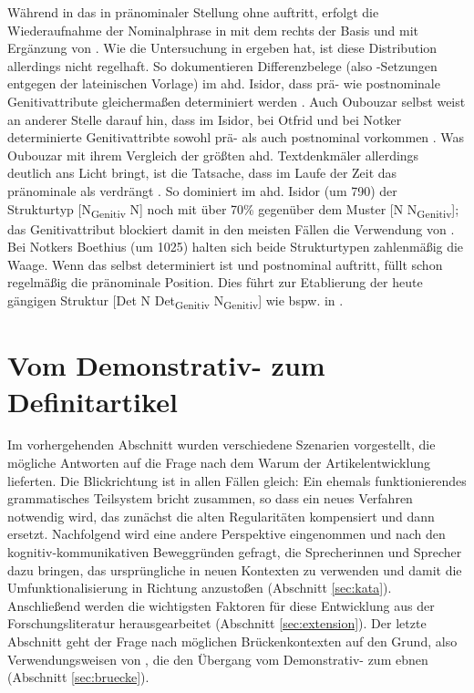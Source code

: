 \noindent
Während in  das   in pränominaler Stellung ohne  auftritt, erfolgt die Wiederaufnahme der Nominalphrase  in  mit dem  rechts der Basis und mit Ergänzung von . Wie die Untersuchung in \textcite{Szczepaniak2015} ergeben hat, ist diese Distribution allerdings nicht regelhaft. So dokumentieren Differenzbelege  (also -Setzungen entgegen der lateinischen Vorlage) im ahd. Isidor, dass prä- wie postnominale Genitivattribute  gleichermaßen determiniert werden \parencite[199]{Szczepaniak2015}. Auch Oubouzar selbst weist an anderer Stelle  darauf hin, dass im Isidor, bei Otfrid und bei Notker determinierte Genitivattribte sowohl prä- als auch postnominal vorkommen \parencite[234]{Oubouzar1997}. Was Oubouzar mit ihrem Vergleich der größten ahd. Textdenkmäler allerdings deutlich ans Licht bringt, ist die Tatsache, dass  im Laufe der Zeit das pränominale  als  verdrängt \parencite[236--241]{Oubouzar1997}. So dominiert im ahd. Isidor (um 790) der Strukturtyp [N\textsubscript{Genitiv} N] noch mit über 70\%  gegenüber dem Muster [N N\textsubscript{Genitiv}]; das Genitivattribut blockiert damit in den meisten Fällen die Verwendung von . Bei Notkers Boethius (um 1025) halten sich beide Strukturtypen zahlenmäßig die Waage. Wenn das  selbst determiniert ist und postnominal auftritt, füllt  schon regelmäßig die pränominale Position. Dies führt zur Etablierung der heute gängigen Struktur  [Det N Det\textsubscript{Genitiv} N\textsubscript{Genitiv}] wie bspw. in  \parencite[241]{Oubouzar1997}. 

\section{Vom Demonstrativ- zum Definitartikel} \label{sec:demzudef}

Im vorhergehenden Abschnitt wurden verschiedene Szenarien vorgestellt, die mögliche Antworten auf die Frage nach dem Warum der Artikelentwicklung lieferten. Die Blickrichtung ist in allen Fällen gleich: Ein ehemals funktionierendes grammatisches Teilsystem bricht zusammen, so dass ein neues Verfahren notwendig wird, das zunächst die alten Regularitäten kompensiert und dann ersetzt. Nachfolgend wird eine andere Perspektive eingenommen und nach den kognitiv-kommunikativen Beweggründen gefragt, die Sprecherinnen und Sprecher dazu bringen, das ursprüngliche  in neuen Kontexten zu verwenden und damit die Umfunktionalisierung in Richtung  anzustoßen  (Abschnitt \ref{sec:kata}). Anschließend werden die wichtigsten Faktoren für diese Entwicklung aus der Forschungsliteratur herausgearbeitet (Abschnitt \ref{sec:extension}). Der letzte Abschnitt geht der Frage nach möglichen Brückenkontexten auf den Grund, also Verwendungsweisen von , die den Übergang vom Demonstrativ-  zum  ebnen (Abschnitt \ref{sec:bruecke}).  

